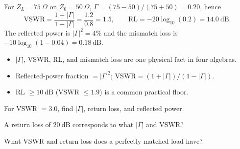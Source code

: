 \begin{workedexample}
For $Z_L = 75\ \Omega$ on $Z_0 = 50\ \Omega$,
$\Gamma = (75-50)/(75+50) = 0.20$, hence
\[ \text{VSWR} = \frac{1+|\Gamma|}{1-|\Gamma|} = \frac{1.2}{0.8} = 1.5, \qquad
   \text{RL} = -20\log_{10}(0.2) = 14.0\ \text{dB}. \]
The reflected power is $|\Gamma|^2 = 4\%$ and the mismatch loss is
$-10\log_{10}(1-0.04) = 0.18\ \text{dB}$.
\end{workedexample}

\begin{keytakeaways}
\begin{itemize}[leftmargin=1.4em,itemsep=2pt]
\item $|\Gamma|$, VSWR, RL, and mismatch loss are one physical fact in four algebras.
\item Reflected-power fraction $= |\Gamma|^2$; $\text{VSWR} = (1+|\Gamma|)/(1-|\Gamma|)$.
\item RL $\ge 10\ \text{dB}$ (VSWR $\le 1.9$) is a common practical floor.
\end{itemize}
\end{keytakeaways}

\begin{exercises}
\item For VSWR $= 3.0$, find $|\Gamma|$, return loss, and reflected power.
\item A return loss of $20\ \text{dB}$ corresponds to what $|\Gamma|$ and VSWR?
\item What VSWR and return loss does a perfectly matched load have?
\end{exercises}

